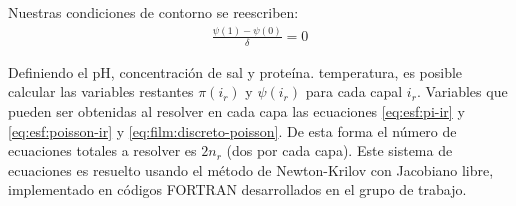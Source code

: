 Nuestras condiciones de contorno se reescriben:
\begin{align}
	\frac{\psi(1) - \psi(0)}{\delta} = 0
\end{align}

Definiendo  el pH, concentraci\'on de sal y prote\'ina. temperatura, es posible calcular las variables restantes  $\pi(i_r)$ y $\psi(i_r)$ para cada capal $i_r$.
Variables que pueden ser obtenidas al resolver en cada capa las ecuaciones \ref{eq:esf:pi-ir} y \ref{eq:esf:poisson-ir} y \ref{eq:film:discreto-poisson}.
De esta forma el n\'umero de ecuaciones totales a resolver es $2n_r$ (dos por cada capa). 
Este sistema de ecuaciones es resuelto usando el m\'etodo de Newton-Krilov con Jacobiano libre, implementado en c\'odigos FORTRAN desarrollados en el grupo de trabajo.

